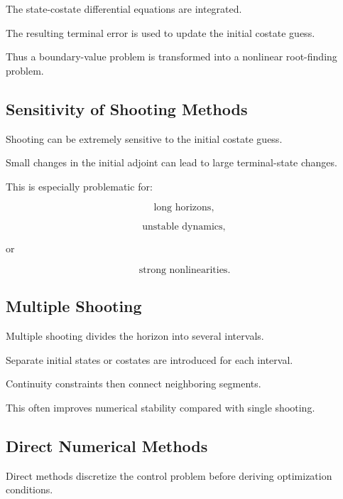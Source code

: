 The state-costate differential equations are integrated.

The resulting terminal error is used to update the initial costate guess.

Thus a boundary-value problem is transformed into a nonlinear root-finding
problem.

\subsection{Sensitivity of Shooting Methods}
\label{subsec:shooting-sensitivity}

Shooting can be extremely sensitive to the initial costate guess.

Small changes in the initial adjoint can lead to large terminal-state
changes.

This is especially problematic for:

\[
\boxed{
\text{long horizons},
}
\]

\[
\boxed{
\text{unstable dynamics},
}
\]

or

\[
\boxed{
\text{strong nonlinearities}.
}
\]

\subsection{Multiple Shooting}
\label{subsec:multiple-shooting}

Multiple shooting divides the horizon into several intervals.

Separate initial states or costates are introduced for each interval.

Continuity constraints then connect neighboring segments.

This often improves numerical stability compared with single shooting.

\subsection{Direct Numerical Methods}
\label{subsec:direct-optimal-control-methods}

Direct methods discretize the control problem before deriving optimization
conditions.

